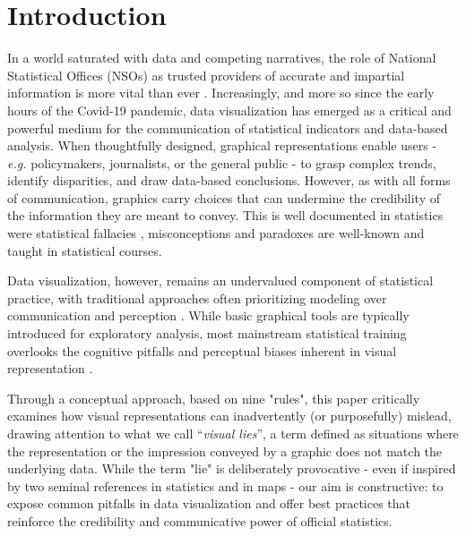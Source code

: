 \documentclass[11pt,twoside,a4paper]{article}
\begin{document}
\section{Introduction}
In a world saturated with data and competing narratives, the role of National Statistical Offices (NSOs) as trusted providers of accurate and impartial information is more vital than ever \citep{Hossein2023-DataGov, Schreyer2024-Intw, Perucci22024-Trust, Pullinger2020-Trust}. Increasingly, and more so since the early hours of the Covid-19 pandemic, data visualization has emerged as a critical and powerful medium for the communication of statistical indicators and data-based analysis. When thoughtfully designed, graphical representations enable users - \emph{ e.g.}  policymakers, journalists, or the general public - to grasp complex trends, identify disparities, and draw data-based conclusions. However, as with all forms of communication, graphics carry choices that can undermine the credibility of the information they are meant to convey. This is well documented in statistics were statistical fallacies \citep{Huff1954}, misconceptions and paradoxes \citep{blyth1973simpson} are well-known and taught in statistical courses.

Data visualization, however, remains an undervalued component of statistical practice, with traditional approaches often prioritizing modeling over communication and perception \citep{Wickham2014}. While basic graphical tools are typically introduced for exploratory analysis, most mainstream statistical training overlooks the cognitive pitfalls and perceptual biases inherent in visual representation \citep{Cleveland1984, Cairo2019, healey2007perception}.



Through a conceptual approach, based on nine "rules", this paper critically examines how visual representations can inadvertently (or purposefully) mislead, drawing attention to what we call “\textit{visual lies}”, a term defined  \citep{Tufte2001} as situations where the representation or the impression conveyed by a graphic does not match the underlying data. While the term "lie"  is deliberately provocative - even if inspired by two seminal references in statistics \citep{Huff1954} and in maps \citep{Monmonier1991} - our aim is constructive: to expose common pitfalls in data visualization and offer best practices that reinforce the credibility and communicative power of official statistics.
\end{document}
